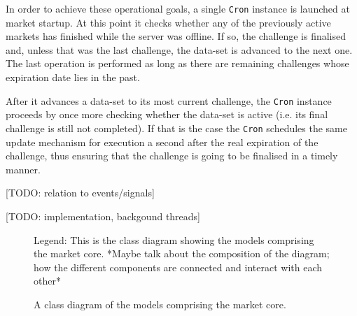 \documentclass[bsc,frontabs,twoside,singlespacing,parskip,deptreport]{infthesis}     %
\begin{document}
	In order to achieve these operational goals, a single {\tt Cron} instance is launched at market startup. At this point it checks whether any of the previously active markets has finished while the server was offline. If so, the challenge is finalised and, unless that was the last challenge, the data-set is advanced to the next one. The last operation is performed as long as there are remaining challenges whose expiration date lies in the past. 

	After it advances a data-set to its most current challenge, the {\tt Cron} instance proceeds by once more checking whether the data-set is active (i.e. its final challenge is still not completed). If that is the case the {\tt Cron} schedules the same update mechanism for execution a second after the real expiration of the challenge, thus ensuring that the challenge is going to be finalised in a timely manner. 

	[TODO: relation to events/signals]
	
	[TODO: implementation, backgound threads]

\begin{figure}
\caption{A class diagram of the models comprising the market core. }
\noindent{}
\label{fig:class-diagram}
{Legend: This is the class diagram showing the models comprising the market core. *Maybe talk about the composition of the diagram; how the different components are connected and interact with each other*}
\end{figure}
\end{document}
